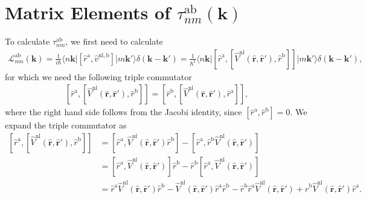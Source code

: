 
\section{Matrix Elements of 
\texorpdfstring{$\tau^{\mathrm{a}\mathrm{b}}_{nm}(\mathbf{k})$}{tnm}}
\label{app:calt}

To calculate $\tau^{\mathrm{a}\mathrm{b}}_{nm}$, we first need to calculate
\begin{align}\label{3.1}
\mathcal{L}^{\mathrm{a}\mathrm{b}}_{nm}(\mathbf{k})
=\frac{1}{i\hbar}\langle n\mathbf{k}\vert 
\left[\hat{r}^{\mathrm{a}},\hat{v}^{\mathrm{nl},\mathrm{b}}\right]
\vert m\mathbf{k}'\rangle \delta(\mathbf{k}-\mathbf{k}')
= \frac{1}{\hbar^{2}}
\langle n\mathbf{k}\vert 
\left[\hat{r}^{\mathrm{a}},
\left[\hat{V}^\mathrm{nl}(\hat{\mathbf{r}},\hat{\mathbf{r}}'),\hat{r}^\mathrm{b}
\right]
\right]
\vert m\mathbf{k}'\rangle\delta(\mathbf{k}-\mathbf{k}'),
\end{align} 
for which we need the following triple commutator
\begin{align}\label{3.2}
\left[\hat{r}^{\mathrm{a}},
\left[\hat{V}^\mathrm{nl}(\hat{\mathbf{r}},\hat{\mathbf{r}}'),\hat{r}^\mathrm{b}
\right]
\right]
= \left[\hat{r}^{\mathrm{b}},
\left[\hat{V}^\mathrm{nl}(\hat{\mathbf{r}},\hat{\mathbf{r}}'),\hat{r}^\mathrm{a}
\right]
\right],
\end{align} 
where the right hand side follows from the Jacobi identity, since
$[\hat{r}^\mathrm{a},\hat{r}^\mathrm{b}] = 0$. We expand the triple commutator
as
\begin{align}\label{3.3}
\left[
  \hat{r}^{\mathrm{a}},
\left[
  \hat{V}^\mathrm{nl}(\hat{\mathbf{r}},\hat{\mathbf{r}}'),
  \hat{r}^\mathrm{b}
\right]
\right]
&=\left[
  \hat{r}^{\mathrm{a}},
  \hat{V}^\mathrm{nl}(\hat{\mathbf{r}},\hat{\mathbf{r}}')
  \hat{r}^\mathrm{b}
\right]
-\left[
  \hat{r}^{\mathrm{a}},
  \hat{r}^\mathrm{b}\hat{V}^\mathrm{nl}(\hat{\mathbf{r}},\hat{\mathbf{r}}')
\right]\nonumber\\
&=\left[
  \hat{r}^{\mathrm{a}},
\hat{V}^\mathrm{nl}(\hat{\mathbf{r}},\hat{\mathbf{r}}')
\right]\hat{r}^\mathrm{b}
- \hat{r}^\mathrm{b}
\left[
  \hat{r}^{\mathrm{a}},
  \hat{V}^\mathrm{nl}(\hat{\mathbf{r}},\hat{\mathbf{r}}')
\right]\nonumber\\
&=\hat{r}^{\mathrm{a}}
  \hat{V}^\mathrm{nl}(\hat{\mathbf{r}},\hat{\mathbf{r}}')
  \hat{r}^\mathrm{b}
- \hat{V}^\mathrm{nl}(\hat{\mathbf{r}},\hat{\mathbf{r}}')
  \hat{r}^\mathrm{a}
  \hat{r}^{\mathrm{b}}
- \hat{r}^\mathrm{b}
  \hat{r}^{\mathrm{a}}
  \hat{V}^\mathrm{nl}(\hat{\mathbf{r}},\hat{\mathbf{r}}')
+ \hat{r}^\mathrm{b}
  \hat{V}^\mathrm{nl}(\hat{\mathbf{r}},\hat{\mathbf{r}}')
  \hat{r}^{\mathrm{a}}.
\end{align}
